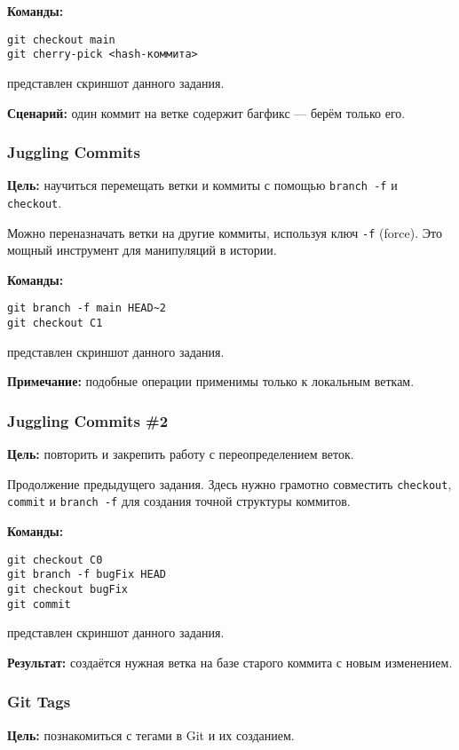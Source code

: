 \documentclass[a4paper,12pt]{report}
\begin{document}
\textbf{Команды:}
\begin{verbatim}
git checkout main
git cherry-pick <hash-коммита>
\end{verbatim}

 представлен скриншот данного задания.

\textbf{Сценарий:} один коммит на ветке содержит багфикс — берём только его.

\subsubsection{Juggling Commits}
\textbf{Цель:} научиться перемещать ветки и коммиты с помощью \texttt{branch -f} и \texttt{checkout}.

Можно переназначать ветки на другие коммиты, используя ключ \texttt{-f} (force). Это мощный инструмент для манипуляций в истории.

\textbf{Команды:}
\begin{verbatim}
git branch -f main HEAD~2
git checkout C1
\end{verbatim}

 представлен скриншот данного задания.

\textbf{Примечание:} подобные операции применимы только к локальным веткам.

\subsubsection{Juggling Commits \#2}
\textbf{Цель:} повторить и закрепить работу с переопределением веток.

Продолжение предыдущего задания. Здесь нужно грамотно совместить \texttt{checkout}, \texttt{commit} и \texttt{branch -f} для создания точной структуры коммитов.

\textbf{Команды:}
\begin{verbatim}
git checkout C0
git branch -f bugFix HEAD
git checkout bugFix
git commit
\end{verbatim}

 представлен скриншот данного задания.

\textbf{Результат:} создаётся нужная ветка на базе старого коммита с новым изменением.

\subsubsection{Git Tags}
\textbf{Цель:} познакомиться с тегами в Git и их созданием.
\end{document}
